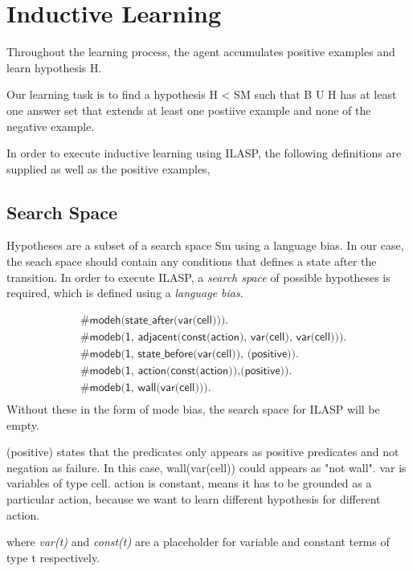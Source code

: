 \section{Inductive Learning}
\label{induction}
Throughout the learning process, the agent accumulates positive examples and learn hypothesis H.

Our learning task is to find a hypothesis H < SM such that B U H has at least one answer set that extends at least one postiive example and none of the negative example.

In order to execute inductive learning using ILASP, the following definitions are supplied as well as the positive examples,

\subsection{Search Space}

Hypotheses are a subset of a search space Sm using a language bias. In our case, the seach space should contain any conditions that defines a state after the transition.
In order to execute ILASP, a \textit{search space} of possible hypotheses is required, which is defined using a \textit{language bias}.

\begin{equation}
\begin{split}
&\textsf{\#modeh(state\_after(var(cell))).}\\
&\textsf{\#modeb(1, adjacent(const(action), var(cell), var(cell))).} \\
&\textsf{\#modeb(1, state\_before(var(cell)), (positive)).} \\
&\textsf{\#modeb(1, action(const(action)),(positive)).} \\
&\textsf{\#modeb(1, wall(var(cell))).} \\
\end{split}
\end{equation}
Without these in the form of mode bias, the search space for ILASP will be empty.

(positive) states that the predicates only appears as positive predicates and not negation as failure. In this case, wall(var(cell)) could appears as "not wall". 
var is variables of type cell. 
action is constant, means it has to be grounded as a particular action, because we want to learn different hypothesis for different action. 

where \textit{var(t)} and \textit{const(t)} are a placeholder for variable and constant terms of type t respectively.


